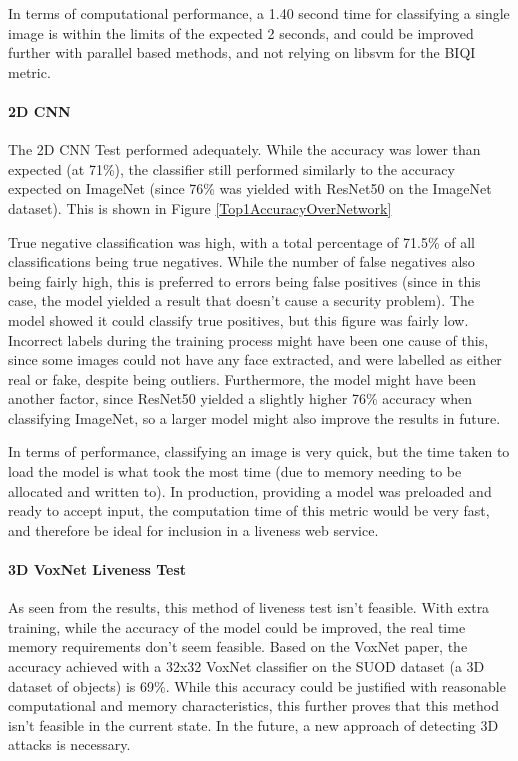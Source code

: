 \documentclass[12pt,a4paper]{article}
\begin{document}
            In terms of computational performance, a 1.40 second time for classifying a single image is within the limits of the expected 2 seconds, and could be improved further
            with parallel based methods, and not relying on libsvm for the BIQI metric.
        \paragraph{2D CNN}
            The 2D CNN Test performed adequately. While the accuracy was lower than expected (at 71\%), the classifier still performed similarly to the accuracy expected on
            ImageNet (since 76\% was yielded with ResNet50 on the ImageNet dataset). This is shown in Figure \ref{Top1AccuracyOverNetwork}

            True negative classification was high, with a total percentage of 71.5\% of all classifications being true negatives. While the number of false negatives also being fairly high,
            this is preferred to errors being false positives (since in this case, the model yielded a result that doesn't cause a security problem).
            The model showed it could classify true positives, but this figure was fairly low. Incorrect labels during the training process might have been one cause of this,
            since some images could not have any face extracted, and were labelled as either real or fake, despite being outliers. Furthermore, the model might have been
            another factor, since ResNet50 yielded a slightly higher 76\% accuracy when classifying ImageNet, so a larger model might also improve the results in future.

            In terms of performance, classifying an image is very quick, but the time taken to load the model is what took the most time (due to memory needing to be allocated and written to).
            In production, providing a model was preloaded and ready to accept input, the computation time of this metric would be very fast, and therefore be ideal for inclusion in a liveness web service.
        
        \paragraph{3D VoxNet Liveness Test}
            As seen from the results, this method of liveness test isn't feasible. With extra training, while the accuracy of the model could be improved, the
            real time memory requirements don't seem feasible. Based on the VoxNet paper, the accuracy achieved with a 32x32 VoxNet classifier on the SUOD dataset (a 3D dataset of objects)
            is 69\%. While this accuracy could be justified with reasonable computational and memory characteristics, this further proves that this method isn't feasible in the current state. In the future, a new approach of detecting 3D attacks is necessary.
        
\end{document}
